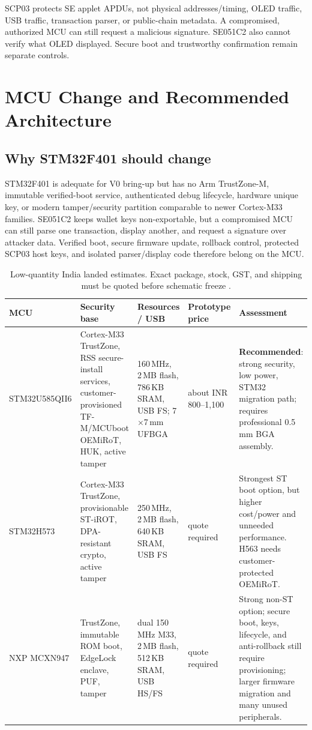 \documentclass[10pt]{article}
\begin{document}
SCP03 protects SE applet APDUs, not physical addresses/timing, OLED traffic,
USB traffic, transaction parser, or public-chain metadata. A compromised,
authorized MCU can still request a malicious signature. SE051C2 also cannot
verify what OLED displayed. Secure boot and trustworthy confirmation remain
separate controls.

\section{MCU Change and Recommended Architecture}
\subsection{Why STM32F401 should change}
STM32F401 is adequate for V0 bring-up but has no Arm TrustZone-M, immutable
verified-boot service, authenticated debug lifecycle, hardware unique key, or
modern tamper/security partition comparable to newer Cortex-M33 families.
SE051C2 keeps wallet keys non-exportable, but a compromised MCU can still parse
one transaction, display another, and request a signature over attacker data.
Verified boot, secure firmware update, rollback control, protected SCP03 host
keys, and isolated parser/display code therefore belong on the MCU.

\begin{table}[H]
\centering\scriptsize
\renewcommand{\arraystretch}{1.15}
\begin{tabularx}{\textwidth}{@{}p{2.5cm}p{3cm}p{2.7cm}p{2.4cm}X@{}}
\toprule
\textbf{MCU} & \textbf{Security base} & \textbf{Resources / USB} &
\textbf{Prototype price} & \textbf{Assessment}\\
\midrule
STM32U585QII6 & Cortex-M33 TrustZone, RSS secure-install services,
customer-provisioned TF-M/MCUboot OEMiRoT, HUK, active tamper & 160\,MHz,
2\,MB flash, 786\,KB SRAM, USB FS;
7$\times$7\,mm UFBGA & about INR 800--1,100 &
\textbf{Recommended}: strong security, low power, STM32 migration path;
requires professional 0.5\,mm BGA assembly.\\
STM32H573 & Cortex-M33 TrustZone, provisionable ST-iROT, DPA-resistant crypto,
active tamper & 250\,MHz, 2\,MB flash, 640\,KB SRAM, USB FS &
quote required & Strongest ST boot option, but higher cost/power and
unneeded performance. H563 needs customer-protected OEMiRoT.\\
NXP MCXN947 & TrustZone, immutable ROM boot, EdgeLock enclave, PUF, tamper &
dual 150\,MHz M33, 2\,MB flash, 512\,KB SRAM, USB HS/FS &
quote required & Strong non-ST option; secure boot, keys, lifecycle, and
anti-rollback still require provisioning; larger firmware migration and
many unused peripherals.\\
\bottomrule
\end{tabularx}
\caption{Low-quantity India landed estimates. Exact package, stock, GST, and
shipping must be quoted before schematic freeze
\cite{stm32u5,stm32h5,mcxn,mcu-price}.}
\end{table}
\end{document}
